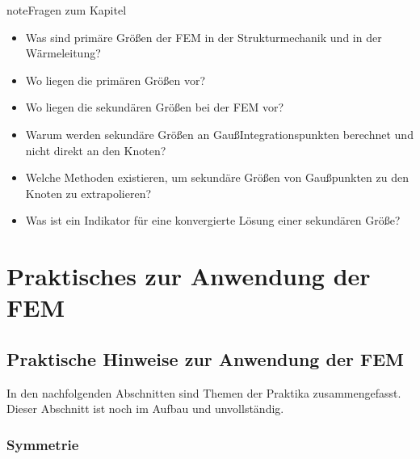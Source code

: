 \documentclass[letterpaper,10pt,german]{jupyterBook}
\begin{document}
\begin{sphinxadmonition}{note}{Fragen zum Kapitel}

\sphinxAtStartPar
{}
\begin{itemize}
\item {} 
\sphinxAtStartPar
Was sind primäre Größen der FEM in der Strukturmechanik und in der Wärmeleitung?

\item {} 
\sphinxAtStartPar
Wo liegen die primären Größen vor?

\item {} 
\sphinxAtStartPar
Wo liegen die sekundären Größen bei der FEM vor?

\item {} 
\sphinxAtStartPar
Warum werden sekundäre Größen an Gauß\sphinxhyphen{}Integrationspunkten berechnet und nicht direkt an den Knoten?

\item {} 
\sphinxAtStartPar
Welche Methoden existieren, um sekundäre Größen von Gaußpunkten zu den Knoten zu extrapolieren?

\item {} 
\sphinxAtStartPar
Was ist ein Indikator für eine konvergierte Lösung einer sekundären Größe?

\end{itemize}
\end{sphinxadmonition}

\sphinxstepscope


\part{Praktisches zur Anwendung der FEM}

\sphinxstepscope


\chapter{Praktische Hinweise zur Anwendung der FEM}
\label{\detokenize{chapters/chapter4/Overview:praktische-hinweise-zur-anwendung-der-fem}}\label{\detokenize{chapters/chapter4/Overview::doc}}
\sphinxAtStartPar
In den nachfolgenden Abschnitten sind Themen der Praktika zusammengefasst. Dieser Abschnitt ist noch im Aufbau und unvollständig.

\sphinxstepscope


\section{Symmetrie}
\label{\detokenize{chapters/chapter4/Symmetrie:symmetrie}}\label{\detokenize{chapters/chapter4/Symmetrie::doc}}
\sphinxstepscope
\end{document}
